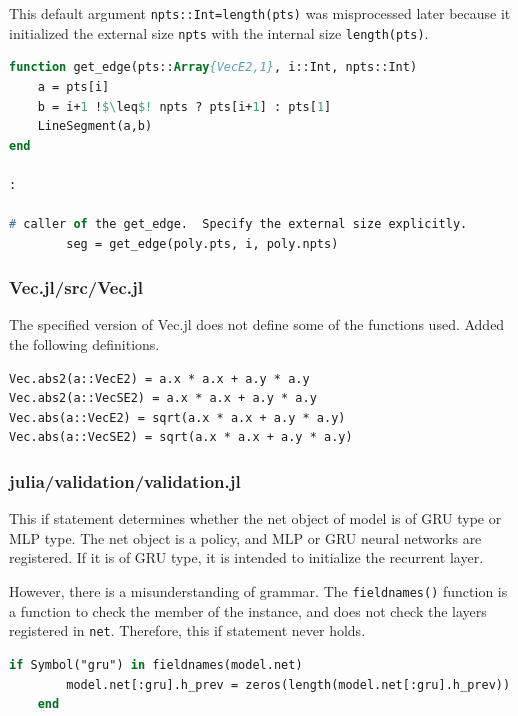 This default argument {\tt npts::Int=length(pts)} was misprocessed later because it initialized the external size {\tt npts} with the internal size {\tt length(pts)}.



\begin{lstlisting}[caption=Changed code 
,label=list:julia_06_automotive, escapechar=!, language=Pascal, frame=single]
function get_edge(pts::Array{VecE2,1}, i::Int, npts::Int)  
    a = pts[i]
    b = i+1 !$\leq$! npts ? pts[i+1] : pts[1]
    LineSegment(a,b)
end

:

# caller of the get_edge.  Specify the external size explicitly.
        seg = get_edge(poly.pts, i, poly.npts)  

\end{lstlisting}


\subsubsection{Vec.jl/src/Vec.jl}

The specified version of Vec.jl does not define some of the functions used. Added the following definitions.

\begin{lstlisting}[caption=Added code 
,label=list:julia_06_vec, escapechar=!, language=Pascal, frame=single]
Vec.abs2(a::VecE2) = a.x * a.x + a.y * a.y
Vec.abs2(a::VecSE2) = a.x * a.x + a.y * a.y
Vec.abs(a::VecE2) = sqrt(a.x * a.x + a.y * a.y)
Vec.abs(a::VecSE2) = sqrt(a.x * a.x + a.y * a.y)
\end{lstlisting}


\subsubsection{julia/validation/validation.jl}

This if statement determines whether the net object of model is of GRU type or MLP type. The net object is a policy, and MLP or GRU neural networks are registered. If it is of GRU type, it is intended to initialize the recurrent layer.

However, there is a misunderstanding of grammar. The {\tt fieldnames()} function is a function to check the member of the instance, and does not check the layers registered in {\tt net}.
Therefore, this if statement never holds.


\begin{lstlisting}[caption=Original code 
,label=list:julia_06_vec, escapechar=!, language=Pascal, frame=single]
    if Symbol("gru") in fieldnames(model.net)
        model.net[:gru].h_prev = zeros(length(model.net[:gru].h_prev))
    end
\end{lstlisting}

